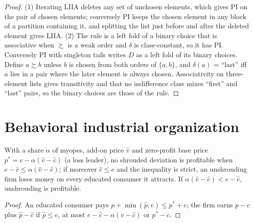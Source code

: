 \begin{proof}
\leanok
(1) Iterating LIIA deletes any set of unchosen elements, which gives PI on the pair of chosen elements; conversely PI keeps
the chosen element in any block of a partition containing it, and splitting the list just before and after the deleted
element gives LIIA. (2) The rule is a left fold of a binary choice that is associative when $\succsim$ is a weak order and
$\delta$ is class-constant, so it has PI. Conversely PI with singleton tails writes $D$ as a left fold of its binary
choices. Define $a\succsim b$ unless $b$ is chosen from both orders of $\{a,b\}$, and $\delta(a)$ = ``last'' iff $a$ lies in
a pair where the later element is always chosen. Associativity on three-element lists gives transitivity and that no
indifference class mixes ``first'' and ``last'' pairs, so the binary choices are those of the rule.
\end{proof}

\section{Behavioral industrial organization}
\label{sec:beh-io}

\begin{theorem}
\label{thm:beh-gl}
\leanok
With a share $\alpha$ of myopes, add-on price $\hat v$ and zero-profit base price $p^*=c-\alpha(\hat v-\hat c)$ (a loss
leader), no shrouded deviation is profitable when $e-\hat c\le\alpha(\hat v-\hat c)$; if moreover $\hat c\le e$ and the
inequality is strict, an unshrouding firm loses money on every educated consumer it attracts. If
$\alpha(\hat v-\hat c)<e-\hat c$, unshrouding is profitable.
\end{theorem}
\begin{proof}
\leanok
An educated consumer pays $p+\min(\hat p,e)\le p^*+e$; the firm earns $p-c$ plus $\hat p-\hat c$ if $\hat p\le e$, at most
$e-\hat c-\alpha(\hat v-\hat c)$ or $p^*-c$.
\end{proof}

